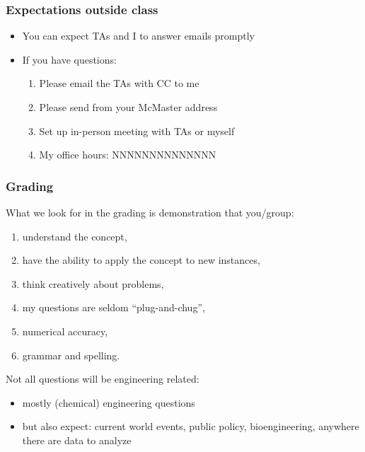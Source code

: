 \begin{frame}\frametitle{Expectations outside class}
	\begin{itemize}
		\item	You can expect TAs and I to answer emails promptly 
		\item	If you have questions: 
		\begin{enumerate}
			\item	Please email the TAs with CC to me \hfill {\tiny{\color{myOrange}{$\longleftarrow$ hopefully this solves your problem}}}
			\item	Please send from your McMaster address
			\item	Set up in-person meeting with TAs or myself 
			\item	My office hours: NNNNNNNNNNNNNN
		\end{enumerate}
	\end{itemize}
\end{frame}

\begin{frame}\frametitle{Grading}
	
	What we look for in the grading is demonstration that you/group: 
	\begin{enumerate}
		\item	understand the concept, 
		\item	have the ability to apply the concept to new instances, 
		\item	think creatively about problems, 
		\item	my questions are seldom ``plug-and-chug'',
		\item	numerical accuracy, 
		\item	grammar and spelling.
	\end{enumerate}
	
	Not all questions will be engineering related: 
	\begin{itemize}
		\item	mostly (chemical) engineering questions 
		\item	but also expect: current world events, public policy, bioengineering, anywhere there are data to analyze 
	\end{itemize}
\end{frame}

